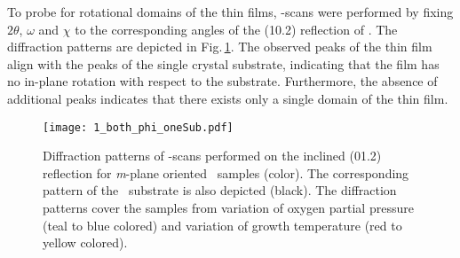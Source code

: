 To probe for rotational domains of the thin films, \textphi-scans were performed by fixing $2\theta$, $\omega$ and $\chi$ to the corresponding angles of the (10.2) reflection of \cro.
The diffraction patterns are depicted in Fig.\,\ref{Fig:Results_1_phiScan}.
The observed peaks of the thin film align with the peaks of the single crystal substrate, indicating that the film has no in-plane rotation with respect to the substrate.
Furthermore, the absence of additional peaks indicates that there exists only a single domain of the thin film.
\begin{figure}
    \centering
    \texttt{[image: 1\_both\_phi\_oneSub.pdf]}
    \caption{
        Diffraction patterns of \textphi-scans performed on the inclined (01.2) reflection for \textit{m}-plane oriented \cro\ samples (color).
        The corresponding pattern of the \alo\ substrate is also depicted (black).
        The diffraction patterns cover the samples from variation of oxygen partial pressure (teal to blue colored) and variation of growth temperature (red to yellow colored).
    }
    \label{Fig:Results_1_phiScan}
\end{figure}

